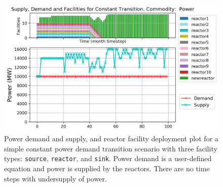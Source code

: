     \begin{figure}[]
        \centering
        \includegraphics[width=0.9\linewidth]{figures/constanttransition-power.png} 
            \caption{Power demand and supply, and reactor facility deployment plot for  
            a simple constant power demand transition scenario with 
            three facility types: \texttt{source}, \texttt{reactor}, and \texttt{sink}.
            Power demand is a user-defined equation and power is supplied by the reactors.
            There are no time steps with undersupply of power.}
            \label{fig:constanttransition-power}
    \end{figure}

